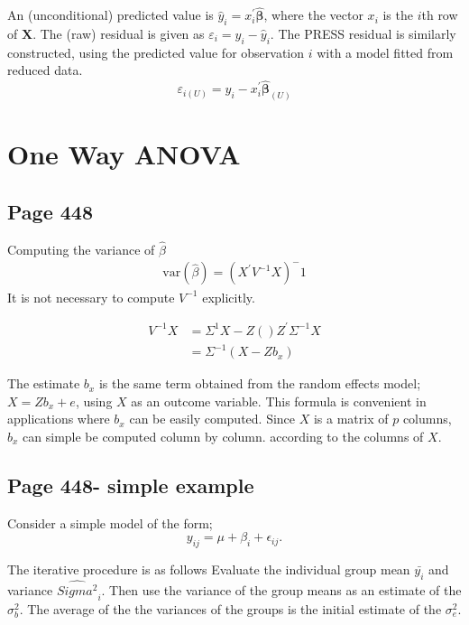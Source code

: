 \documentclass[12pt, a4paper]{report}
\theoremstyle{plain}
\theoremstyle{definition}
\theoremstyle{remark}
\begin{document}

	An (unconditional) predicted value is $\hat{y}_i = x^{\prime}_i \boldsymbol{\hat{\beta}}$, where
	the vector $x_i$ is the $i$th row of $\boldsymbol{X}$.
	The (raw) residual is given as $\varepsilon_i = y_i - \hat{y}_i$. The PRESS residual is
	similarly constructed, using the predicted value for observation $i$ with a model fitted from reduced data.
	\[ \varepsilon_{i(U)} = y_i - x^{\prime}_i \boldsymbol{\hat{\beta}}_{(U)} \]
	
	
	
	


	\section{One Way ANOVA}
	\subsection{Page 448}
	Computing the variance of $\hat{\beta}$
	\begin{eqnarray}
	\mbox{var}(\hat{\beta}) = (X^{\prime}V^{-1}X)^-1
	\end{eqnarray}
	It is not necessary to compute $V^{-1}$ explicitly.
	
	\begin{eqnarray}
	V^{-1}X &= \Sigma^{1}{X-Z()Z^{\prime}\Sigma^{-1}X} \\
	&= \Sigma^{-1}(X-Zb_{x})
	\end{eqnarray}
	
	The estimate $b_{x}$ is the same term obtained from the random effects model; $X = Zb_{x} + e$, using $X$ as an outcome variable.
	This formula is convenient in applications where $b_{x}$ can be easily computed. Since $X$ is a matrix of $p$ columns, $b_{x}$ can simple be computed column by column. according to the columns of $X$.
	\subsection{Page 448- simple example}
	Consider a simple model of the form;
	\begin{equation*}
	y_{ij} = \mu + \beta_{i} + \epsilon_{ij}.
	\end{equation*}
	
	The iterative procedure is as follows Evaluate the individual group mean $\bar{y_{i}}$ and variance $\hat{Sigma^2}_{i}$. Then use the variance of the group means as an estimate of the $\sigma^2_{b}$. The average of the the variances of the groups is the initial estimate of the $\sigma^2_{e}$.
\end{document}
